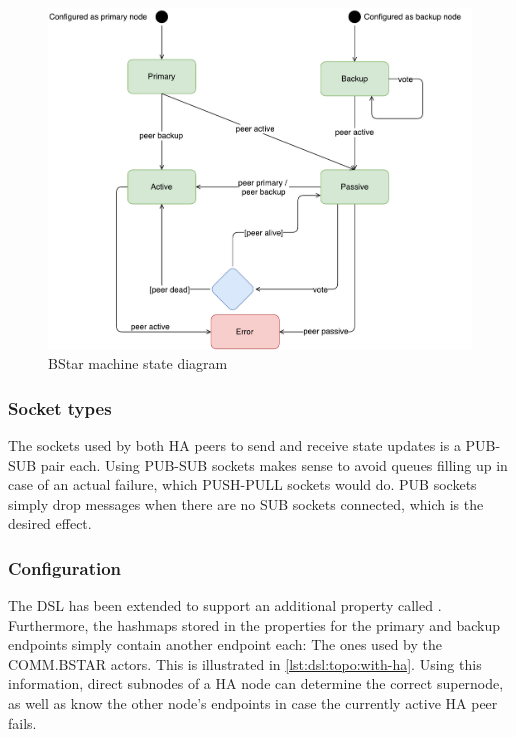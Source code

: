 \begin{figure}[]
	\includegraphics[width=\textwidth]{img/state_machine_diagram_bstar.pdf}
	\caption{BStar machine state diagram}
	\label{fig:bstar:state}
\end{figure}

\subsubsection{Socket types}
The sockets used by both HA peers to send and receive state
updates is a PUB-SUB pair each. Using PUB-SUB sockets makes sense to avoid queues filling up
in case of an actual failure, which PUSH-PULL sockets would do. PUB sockets simply drop messages when there are
no SUB sockets connected, which is the desired effect.


\subsubsection{Configuration}
The DSL has been extended to support an additional property called
. Furthermore, the hashmaps stored in the properties for
the primary and backup endpoints simply contain another endpoint each: The ones
used by the COMM.BSTAR actors. This is illustrated in \autoref{lst:dsl:topo:with-ha}.
Using this information, direct subnodes of a HA node can determine the correct
supernode, as well as know the other node's endpoints in case the currently
active HA peer fails.



